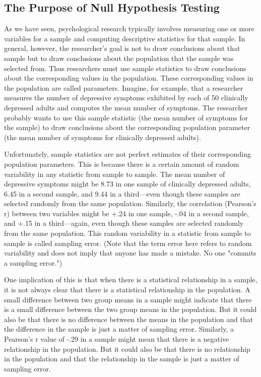 \subsection{The Purpose of Null Hypothesis Testing}

As we have seen, psychological research typically involves measuring one or more variables for a sample and computing descriptive statistics for that sample. In general, however, the researcher's goal is not to draw conclusions about that sample but to draw conclusions about the population that the sample was selected from. Thus researchers must use sample statistics to draw conclusions about the corresponding values in the population. These corresponding values in the population are called parameters. Imagine, for example, that a researcher measures the number of depressive symptoms exhibited by each of 50 clinically depressed adults and computes the mean number of symptoms. The researcher probably wants to use this sample statistic (the mean number of symptoms for the sample) to draw conclusions about the corresponding population parameter (the mean number of symptoms for clinically depressed adults).


Unfortunately, sample statistics are not perfect estimates of their corresponding population parameters. This is because there is a certain amount of random variability in any statistic from sample to sample. The mean number of depressive symptoms might be 8.73 in one sample of clinically depressed adults, 6.45 in a second sample, and 9.44 in a third---even though these samples are selected randomly from the same population. Similarly, the correlation (Pearson's r) between two variables might be +.24 in one sample, -.04 in a second sample, and +.15 in a third---again, even though these samples are selected randomly from the same population. This random variability in a statistic from sample to sample is called sampling error. (Note that the term error here refers to random variability and does not imply that anyone has made a mistake. No one "commits a sampling error.")


One implication of this is that when there is a statistical relationship in a sample, it is not always clear that there is a statistical relationship in the population. A small difference between two group means in a sample might indicate that there is a small difference between the two group means in the population. But it could also be that there is no difference between the means in the population and that the difference in the sample is just a matter of sampling error. Similarly, a Pearson's r value of -.29 in a sample might mean that there is a negative relationship in the population. But it could also be that there is no relationship in the population and that the relationship in the sample is just a matter of sampling error.


